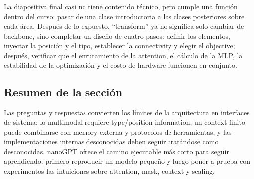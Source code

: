 
La diapositiva final casi no tiene contenido técnico, pero cumple una función dentro del curso: pasar de una clase introductoria a las clases posteriores sobre cada área. Después de lo expuesto, ``transform'' ya no significa solo cambiar de backbone, sino completar un diseño de cuatro pasos: definir los elementos, inyectar la posición y el tipo, establecer la connectivity y elegir el objective; después, verificar que el enrutamiento de la attention, el cálculo de la MLP, la estabilidad de la optimización y el costo de hardware funcionen en conjunto.

\subsection{Resumen de la sección}

Las preguntas y respuestas convierten los límites de la arquitectura en interfaces de sistema: lo multimodal requiere type/position information, un context finito puede combinarse con memory externa y protocolos de herramientas, y las implementaciones internas desconocidas deben seguir tratándose como desconocidas. nanoGPT ofrece el camino ejecutable más corto para seguir aprendiendo: primero reproducir un modelo pequeño y luego poner a prueba con experimentos las intuiciones sobre attention, mask, context y scaling.
